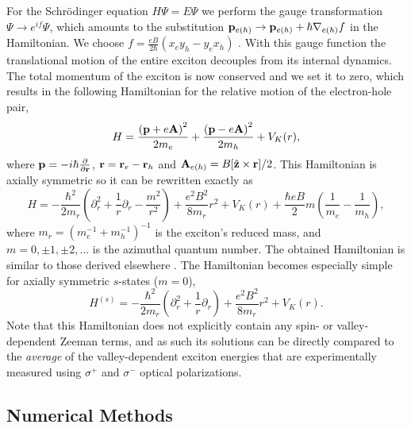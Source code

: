 \documentclass[aps,prl,twocolumn]{revtex4-1}
\begin{document}
For the Schr\"{o}dinger equation $H\Psi=E\Psi$ we perform the gauge transformation $\Psi\rightarrow e^{if}\Psi$, which amounts to the substitution ${\bf p}_{e(h)}\rightarrow{\bf p}_{e(h)}+\hbar\nabla_{e(h)}f$ in the Hamiltonian. We choose $f=\frac{eB}{2\hbar}(x_{e}y_{h}-y_{e}x_{h})$ \cite{Walck-1998-9088}. With this gauge function the translational motion of the entire exciton decouples from its internal dynamics. The total momentum of the exciton is now conserved and we set it to zero, which results in the following Hamiltonian for the relative motion of the electron-hole pair,
%
\begin{equation}
H=\frac{\left({\bf p}+e{\bf A}\right)^{2}}{2m_{e}}+\frac{\left({\bf p}-e{\bf A}\right)^{2}}{2m_{h}}+V_K(r),
\end{equation}
%
where ${\bf p}=-i\hbar\frac{\partial}{\partial{\bf r}}$, ${\bf r}={\bf r}_{e}-{\bf r}_{h}$
and ${\bf A}_{e(h)}=B[\hat{{\bf z}}\times{\bf r}]/2$. This Hamiltonian
is axially symmetric so it can be rewritten exactly as 
%
\begin{equation}
H=-\frac{\hbar^{2}}{2m_r}\left(\partial_{r}^{2}+\frac{1}{r}\partial_{r}-\frac{m^{2}}{r^{2}}\right)+\frac{e^{2}B^{2}}{8m_r}r^{2}+V_K(r) +\frac{\hbar eB}{2}m\left(\frac{1}{m_{e}}-\frac{1}{m_{h}}\right),\label{eq:Hr}
\end{equation}
%
where $m_r=(m_{e}^{-1}+m_{h}^{-1})^{-1}$ is the exciton's reduced mass, and $m=0,\pm1,\pm2,...$ is the azimuthal quantum number. The obtained Hamiltonian is similar to those derived elsewhere \cite{Akimoto-1967-181,MacDonald-1986-8336,Edelstein-1989-7697,Walck-1998-9088,Miura-2008}. The Hamiltonian becomes especially simple for axially symmetric $s$-states ($m=0$),
%
\begin{equation}
H^{(s)}=-\frac{\hbar^{2}}{2m_r}\left(\partial_{r}^{2}+\frac{1}{r}\partial_{r}\right)+\frac{e^{2}B^{2}}{8m_r}r^{2}+V_K(r).\label{eq:HrS}
\end{equation}
%
Note that this Hamiltonian does not explicitly contain any spin- or valley-dependent Zeeman terms, and as such its solutions can be directly compared to the \textit{average} of the valley-dependent exciton energies that are experimentally measured using $\sigma^+$ and $\sigma^-$ optical polarizations. 

\subsection{Numerical Methods}
\end{document}
